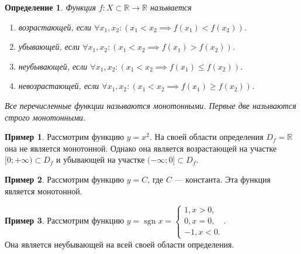 \documentclass[a4paper,12pt]{article} %
\DeclareMathOperator{\sgn}{\mathop{sgn}}
\newtheorem{definition}{Определение}[section]
\theoremstyle{remark}
\theoremstyle{definition}
\newtheorem{exmp}{Пример}[section]
\begin{document}
\begin{definition}
    Функция $f : X \subset \mathbb{R} \to  \mathbb{R}$ называется
    \begin{enumerate}
        \item возрастающей, если $\forall x_1, x_2 : (x_1 < x_2 \implies f(x_1) < f(x_2))$.
        \item убывающей, если $\forall x_1, x_2 : (x_1 < x_2 \implies f(x_1) > f(x_2))$.
        \item неубывающей, если $\forall x_1, x_2 : (x_1 < x_2 \implies f(x_1) \le  f(x_2))$.
        \item невозрастающей, если $\forall x_1, x_2 : (x_1 < x_2 \implies f(x_1) \ge f(x_2))$.
    \end{enumerate}
    Все перечисленные функции называются монотонными. Первые две называются строго монотонными.
\end{definition}
\begin{exmp}
    Рассмотрим функцию $y = x^2$. На своей области определения $D_f = \mathbb{R}$ она не является монотонной.
    Однако она является возрастающей на участке $[0; +\infty)\subset D_f$ и убывающей на участке $(-\infty; 0]\subset D_f$.
\end{exmp}
\begin{exmp}
    Рассмотрим функцию $y = C$, где $C$ --- константа. Эта функция является монотонной.
\end{exmp}
\begin{exmp}
    Рассмотрим функцию $y = \sgn x = \begin{cases} 1, x >0, \\ 0, x = 0, \\ -1, x < 0.  \end{cases}$. \\
    Она является неубывающей на всей своей области определения.
    \begin{center}
    \end{center}
\end{exmp}
\end{document}
